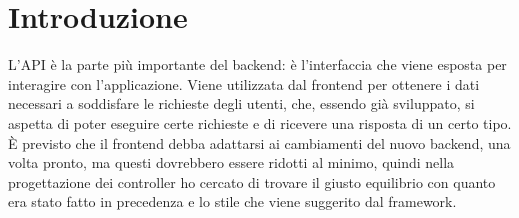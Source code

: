 \section{Introduzione}
L'API è la parte più importante del backend: è l'interfaccia che viene esposta per interagire con l'applicazione. Viene utilizzata dal frontend per ottenere i dati necessari a soddisfare le richieste degli utenti, che, essendo già sviluppato, si aspetta di poter eseguire certe richieste e di ricevere una risposta di un certo tipo. È previsto che il frontend debba adattarsi ai cambiamenti del nuovo backend, una volta pronto, ma questi dovrebbero essere ridotti al minimo, quindi nella progettazione dei controller ho cercato di trovare il giusto equilibrio con quanto era stato fatto in precedenza e lo stile che viene suggerito dal framework.

